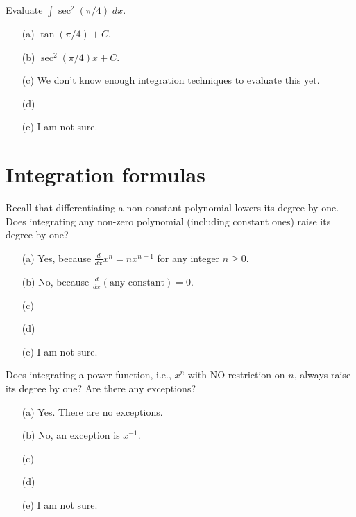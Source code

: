 \documentclass[14pt]{beamer}
\begin{document}
\begin{frame}[t]
  Evaluate \(\int \sec^{2}(\pi/4) \;dx\).

  \begin{itemize} \setlength\itemsep{1ex}
    \item[(a)] \(\tan(\pi/4) + C\).
    \item[(b)] \(\sec^{2}(\pi/4)x + C\).
    \item[(c)] We don't know enough integration techniques to evaluate this yet. 
    \item[(d)] 
    \item[(e)] I am not sure.
  \end{itemize} 
\end{frame}

\section{Integration formulas}
\begin{frame}[t]
  Recall that differentiating a {\color{red} non-constant polynomial} lowers its degree by one. Does integrating any {\color{red} non-zero polynomial} (including constant ones) raise its degree by one?

  \medskip
  \begin{itemize} \setlength\itemsep{1ex}
    \item[(a)] Yes, because \(\frac{d}{dx} x^{n} = n x^{n-1}\) for any integer \(n \ge 0\).
    \item[(b)] No, because \(\frac{d}{dx} (\text{any constant}) = 0\).
    \item[(c)] 
    \item[(d)] 
    \item[(e)] I am not sure.
  \end{itemize} 
\end{frame}

\begin{frame}[t]
  Does integrating a {\color{red} power function}, i.e., \(x^{n}\) with NO restriction on \(n\), always raise its degree by one? Are there any exceptions?

  \medskip
  \begin{itemize} \setlength\itemsep{1ex}
    \item[(a)] Yes. There are no exceptions.
    \item[(b)] No, an exception is \(x^{-1}\).
    \item[(c)] 
    \item[(d)] 
    \item[(e)] I am not sure.
  \end{itemize} 
\end{frame}
\end{document}
